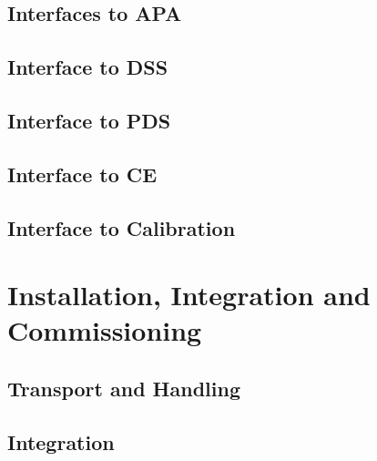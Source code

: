 

\subsection{Interfaces to APA}
\label{sec:fdsp-hv-intfc-cpa-fc}


\subsection{Interface to DSS}
\label{sec:fdsp-hv-intfc-dss}


\subsection{Interface to PDS}
\label{sec:fdsp-hv-intfc-pds}

\subsection{Interface to CE}
\label{sec:fdsp-hv-intfc-ce}

\subsection{Interface to Calibration}
\label{sec:fdsp-hv-intfc-cal}



\section{Installation, Integration and Commissioning}
\label{sec:fdsp-hv-install}

\subsection{Transport and Handling}
\label{sec:fdsp-hv-install-transport}


\subsection{Integration }
\label{sec:fdsp-hv-install-pds-elec}

